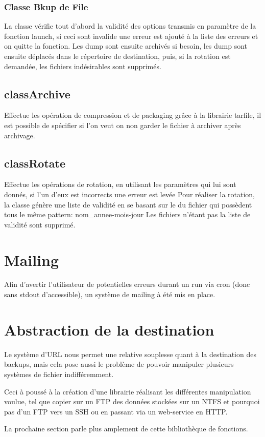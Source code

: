 \subsubsection*{Classe Bkup de File}
La classe vérifie tout d'abord la validité des options transmis en paramètre de la fonction launch, si ceci sont invalide une erreur est ajouté à la liste des erreurs et on quitte la fonction.
Les dump sont ensuite archivés si besoin, les dump sont ensuite déplacés dans le répertoire de destination, puis, si la rotation est demandée, les fichiers indésirables sont supprimés.


\subsection*{classArchive}
Effectue les opération de compression et de packaging grâce à la librairie tarfile, il est possible de spécifier si l'on veut on non garder le fichier à archiver après archivage.

\subsection*{classRotate}
Effectue les opérations de rotation, en utilisant les paramètres qui lui sont donnés, si l'un d'eux est incorrects une erreur est levée
Pour réaliser la rotation, la classe génère une liste de validité en se basant sur le du fichier qui possèdent tous le même pattern: nom\_annee-mois-jour
Les fichiers n'étant pas la liste de validité sont supprimé.


\section*{Mailing}
Afin d'avertir l'utilisateur de potentielles erreurs durant un run via cron (donc sans stdout d'accessible), un système de mailing à été mis en place.


\section*{Abstraction de la destination}
Le système d'URL nous permet une relative souplesse quant à la destination des backups, mais cela pose aussi le problème de pouvoir manipuler plusieurs systèmes de fichier indifféremment.

Ceci à poussé à la création d'une librairie réalisant les différentes manipulation voulue, tel que copier sur un FTP des données stockées sur un NTFS et pourquoi pas d'un FTP vers un SSH ou en passant via un web-service en HTTP.

La prochaine section parle plus amplement de cette bibliothèque de fonctions.
